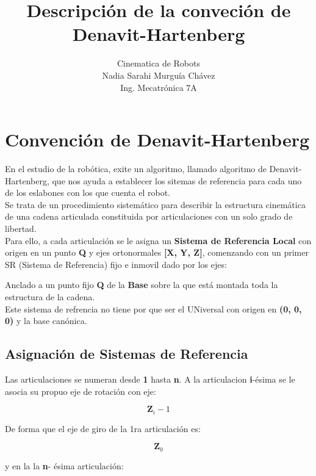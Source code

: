 \documentclass[letter,openright,12pt,spanish]{report}
\title{\textbf{Descripci\'on de la conveci\'on de Denavit-Hartenberg}}
\author{Cinematica de Robots\\
		Nadia Sarahi Murgu\'ia Ch\'avez\\
		Ing. Mecatr\'onica 7A}
\date{}
\begin{document}
\maketitle

\section{Convenci\'on de Denavit-Hartenberg}

En el estudio de la rob\'otica, exite un algoritmo, llamado algoritmo de Denavit-Hartenberg, que nos ayuda a establecer los sitemas de referencia para cada uno de los eslabones con los que cuenta el robot.\\
Se trata de un procedimiento sistem\'atico para describir la estructura cinem\'atica de una cadena articulada constituida por articulaciones con un solo grado de libertad.\\
Para ello, a cada articulaci\'on se le asigna un \textbf{Sistema de Referencia Local} con origen en un punto \textbf{Q} y ejes ortonormales \textbf{[X, Y, Z]}, comenzando con un primer SR (Sistema de Referencia) fijo e inmovil dado por los ejes:

\begin{displaymath}
[\textbf{X}_0, \textbf{Y}_0, \textbf{Z}_0]
\end{displaymath} 
Anclado a un punto fijo \textbf{Q} de la \textbf{Base} sobre la que est\'a montada toda la estructura de la cadena.\\
Este sistema de refrencia no tiene por que ser el UNiversal con origen en \textbf{(0, 0, 0)} y la base can\'onica.

\subsection{Asignaci\'on de Sistemas de Referencia}

Las articulaciones se numeran desde \textbf{1} hasta \textbf{n}. A la articulacion \textbf{i}-\'esima se le asocia su propuo eje de rotaci\'on con eje:

\begin{displaymath}
\textbf{Z}_i-1
\end{displaymath}

De forma que el eje de giro de la 1ra articulaci\'on es:

\begin{displaymath}
\textbf{Z}_0
\end{displaymath}

y en la la \textbf{n}- \'esima articulaci\'on:
\end{document}
